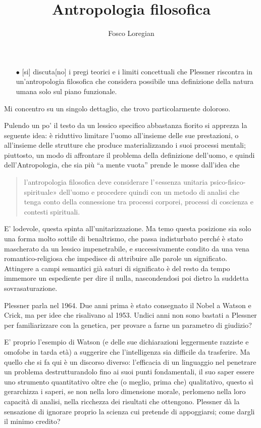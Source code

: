 \documentclass[dvipsnames]{amsart}
\title{Antropologia filosofica}
\author{Fosco Loregian}
\begin{document}
\maketitle 

\begin{itemize}
  \item[$\bullet$] [si] discuta[no] i pregi teorici e i limiti concettuali che Plessner riscontra in un'antropologia filosofica che considera possibile una definizione della natura umana solo sul piano funzionale.
\end{itemize}
Mi concentro su un singolo dettaglio, che trovo particolarmente doloroso.

Pulendo un po' il testo da un lessico specifico abbastanza fiorito si apprezza la seguente idea: è riduttivo limitare l'uomo all'insieme delle sue prestazioni, o all'insieme delle strutture che produce materializzando i suoi processi mentali; piuttosto, un modo di affrontare il problema della definizione dell'uomo, e quindi dell'Antropologia, che sia più ``a mente vuota'' prende le mosse dall'idea che 
\begin{quote}
  l'antropologia filosofica deve considerare l'«essenza unitaria
psico-fisico-spirituale» dell'uomo e procedere quindi con un metodo di analisi che tenga conto della connessione tra processi corporei, processi di coscienza e contesti spirituali.
\end{quote}
E' lodevole, questa spinta all'unitarizzazione. Ma temo questa posizione sia solo una forma molto sottile di benaltrismo, che passa indisturbato perché è stato mascherato da un lessico impenetrabile, e successivamente condito da una vena romantico-religiosa che impedisce di attribuire alle parole un significato. Attingere a campi semantici già saturi di significato è del resto da tempo immemore un espediente per dire il nulla, nascondendosi poi dietro la suddetta sovrasaturazione.

Plessner parla nel 1964. Due anni prima è stato consegnato il Nobel a Watson e Crick, ma per idee \cite{watson1953structure} che risalivano al 1953. Undici anni non sono bastati a Plessner per familiarizzare con la genetica, per provare a farne un parametro di giudizio?

E' proprio l'esempio di Watson (e delle sue dichiarazioni leggermente razziste e omofobe in tarda età) a suggerire che l'intelligenza sia difficile da trasferire. Ma quello che si fa qui è un discorso diverso: l'efficacia di un linguaggio nel penetrare un problema destrutturandolo fino ai suoi punti fondamentali, il suo saper essere uno strumento quantitativo oltre che (o meglio, prima che) qualitativo, questo sì gerarchizza i saperi, se non nella loro dimensione morale, perlomeno nella loro capacità di analisi, nella ricchezza dei risultati che ottengono. Plessner dà la sensazione di ignorare proprio la scienza cui pretende di appoggiarsi; come dargli il minimo credito? %
\end{document}
